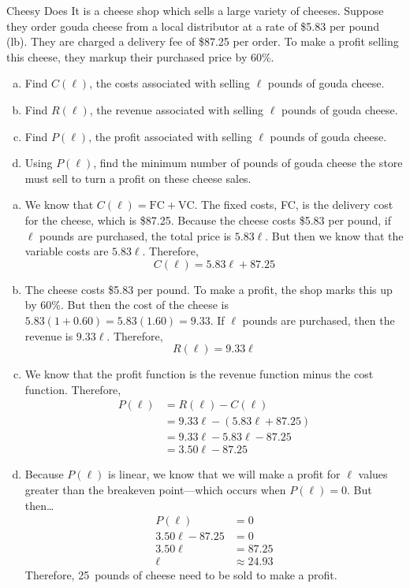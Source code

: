 \documentclass[11pt,letterpaper]{article}
\begin{document}
\newpage



 Cheesy Does It is a cheese shop which sells a large variety of cheeses. Suppose they order gouda cheese from a local distributor at a rate of \$5.83 per pound (lb). They are charged a delivery fee of \$87.25 per order. To make a profit selling this cheese, they markup their purchased price by 60\%. 
	\begin{enumerate}[(a)]
	\item Find $C(\ell)$, the costs associated with selling $\ell$ pounds of gouda cheese.
	\item Find $R(\ell)$, the revenue associated with selling $\ell$ pounds of gouda cheese.
	\item Find $P(\ell)$, the profit associated with selling $\ell$ pounds of gouda cheese.
	\item Using $P(\ell)$, find the minimum number of pounds of gouda cheese the store must sell to turn a profit on these cheese sales. 
	\end{enumerate} \pspace

\sol
\begin{enumerate}[(a)]
\item We know that $C(\ell)= \text{FC} + \text{VC}$. The fixed costs, FC, is the delivery cost for the cheese, which is \$87.25. Because the cheese costs \$5.83 per pound, if $\ell$ pounds are purchased, the total price is $5.83\ell$. But then we know that the variable costs are $5.83\ell$. Therefore, 
	\[
	C(\ell)= 5.83\ell + 87.25
	\]

\item The cheese costs \$5.83 per pound. To make a profit, the shop marks this up by 60\%. But then the cost of the cheese is $5.83(1 + 0.60)= 5.83(1.60)= 9.33$. If $\ell$ pounds are purchased, then the revenue is $9.33\ell$. Therefore,
	\[
	R(\ell)= 9.33\ell
	\]

\item We know that the profit function is the revenue function minus the cost function. Therefore,
	\[
	\begin{aligned}
	P(\ell)&= R(\ell) - C(\ell) \\[0.3cm]
	&= 9.33\ell - (5.83\ell + 87.25) \\[0.3cm]
	&= 9.33\ell - 5.83 \ell - 87.25 \\[0.3cm]
	&= 3.50\ell - 87.25
	\end{aligned}
	\]

\item Because $P(\ell)$ is linear, we know that we will make a profit for $\ell$ values greater than the breakeven point---which occurs when $P(\ell)= 0$. But then\dots
	\[
	\begin{aligned}
	P(\ell)&= 0 \\[0.3cm]
	3.50\ell - 87.25&= 0 \\[0.3cm]
	3.50\ell&= 87.25 \\[0.3cm]
	\ell&\approx 24.93
	\end{aligned}
	\]
Therefore, 25~pounds of cheese need to be sold to make a profit. 
\end{enumerate}
\end{document}
